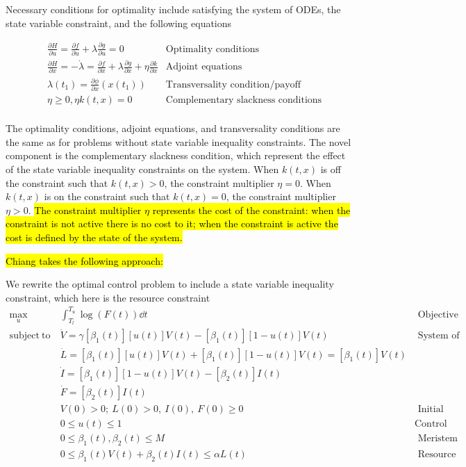 \documentclass[12pt, oneside]{article}   	%
\begin{document}
Necessary conditions for optimality include satisfying the system of ODEs, the state variable constraint, and the following equations

\begin{align}
& \frac{\partial H}{\partial u}  = \frac{\partial f}{\partial u} + \lambda \frac{\partial g}{\partial u} = 0  & \mbox{Optimality conditions} \nonumber \\
 & \frac{\partial H}{\partial x}  = - \dot{\lambda} = \frac{\partial f}{\partial x} + \lambda \frac{\partial g}{\partial x} + \eta \frac{\partial k}{\partial x} & \mbox{Adjoint equations} \nonumber \\
& \lambda(t_1)  = \frac{\partial \phi}{\partial x}  (x(t_1))  & \mbox{Transversality condition/payoff} \nonumber \\
& \eta \geq 0, \eta k(t,x) = 0  & \mbox{Complementary slackness conditions} \nonumber \\
\end{align}

The optimality conditions, adjoint equations, and transversality conditions are the same as for problems without state variable inequality constraints. The novel component is the complementary slackness condition, which represent the effect of the state variable inequality constraints on the system. When $k(t,x)$ is off the constraint such that $k(t,x)>0$, the constraint multiplier $\eta = 0$. When $k(t,x)$ is on the constraint such that $k(t,x)=0$, the constraint multiplier $\eta > 0$. \hl{The constraint multiplier $\eta$ represents the cost of the constraint: when the constraint is not active there is no cost to it; when the constraint is active the cost is defined by the state of the system.}

\hl{Chiang takes the following approach:}

We rewrite the optimal control problem to include a state variable inequality constraint, which here is the resource constraint
%
\begin{align}
\max_{u} &  \int_{T_l}^{T_u}  \log( F(t) ) \dd t & \mbox{ Objective function }   \nonumber \\
\mathrm{subject\ to\ } 
& \dot{V} =  \gamma [\beta_1(t)] [ u(t) ] V(t)  - [\beta_1(t)] [1 - u(t)] V(t) & \mbox{ System of ODEs }   \nonumber \\
& \dot{L} = [\beta_1(t)] [ u(t) ] V(t)  + [\beta_1(t)] [1 - u(t)] V(t) = [ \beta_1(t) ] V(t) \nonumber \\ 
& \dot{I} = [\beta_1(t)] [ 1-u(t) ] V(t) - [\beta_2(t)] I(t) \nonumber  \\ 
& \dot{F} = [\beta_2(t)] I(t)  \nonumber \\ 
& V(0) > 0;\ L(0)>0,\ I(0),\ F(0) \geq 0 & \mbox{ Initial conditions}  \nonumber \\
& 0 \leq u(t) \leq 1 & \mbox{Control constraint} \nonumber \\
& 0 \le \beta_1(t), \beta_2(t) \le M & \mbox{ Meristem constraint}  \nonumber \\
& 0 \le \beta_1(t) V(t) + \beta_2(t) I(t) \le \alpha L(t) & \mbox{ Resource constraint} \nonumber 
\end{align}
\end{document}
